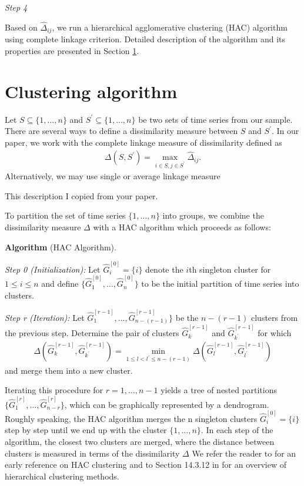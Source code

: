 \documentclass[a4paper,11pt]{article}
\numberwithin{equation}{section}
\begin{document}
\textit{Step 4}

Based on $\widehat{\Delta}_{ij}$, we run a hierarchical agglomerative clustering (HAC) algorithm using complete linkage criterion. Detailed description of the algorithm and its properties are presented in Section \ref{sec:alg}.

\section{Clustering algorithm}\label{sec:alg}

Let $S \subseteq \{1, \ldots, n\}$ and $S^\prime \subseteq \{1, \ldots, n\}$ be two sets of time series from our sample. There are several ways to define a dissimilarity measure between $S$ and $S^\prime$. In our paper, we work with the complete linkage measure of dissimilarity defined as 
\begin{align*}
\Delta (S, S^\prime) = \max_{i \in S, j\in S^\prime} \widehat{\Delta}_{ij}.
\end{align*}
Alternatively, we may use single or average linkage measure 

{\color{red} This description I copied from your paper.

To partition the set of time series $\{1,\ldots, n\}$ into groups, we combine the dissimilarity measure $\Delta$ with a HAC algorithm which proceeds as follows:

\textbf{Algorithm} (HAC Algorithm).

\textit{Step 0 (Initialization):} Let $\hat{G}_i^{[0]} = \{i\}$ denote the $i$th singleton cluster for $1 \leq i \leq n$ and define $\{\hat{G}_1^{[0]}, \ldots, \hat{G}_n^{[0]}\}$ to be the
initial partition of time series into clusters.

\textit{Step r (Iteration):} Let $\hat{G}^{[r-1]}_1, \ldots, \hat{G}^{[r-1]}_{n - (r-1)}\}$ be the $n-(r-1)$ clusters from the previous step. Determine the pair of clusters $\hat{G}^{[r-1]}_k$ and $\hat{G}^{[r-1]}_{k^\prime}$ for which 
\begin{align*}
\Delta(\hat{G}^{[r-1]}_{k}, \hat{G}^{[r-1]}_{k^\prime}) = \min_{1 \leq l < l^\prime \leq n- (r-1)} \Delta(\hat{G}^{[r-1]}_{l}, \hat{G}^{[r-1]}_{l^\prime})
\end{align*}
and merge them into a new cluster.

Iterating this procedure for $r = 1, \ldots, n-1$ yields a tree of nested partitions \linebreak $\{\hat{G}^{[r]}_1, \ldots, \hat{G}^{[r]}_{n-r} \}$, which can be graphically
represented by a dendrogram. Roughly speaking, the HAC algorithm merges the n singleton clusters $\hat{G}^{[0]}_i = \{i\}$ step by step until we end up with the cluster $\{1, \ldots, n\}$. In each step of the algorithm, the closest two clusters are merged, where the distance between clusters is measured in terms of the dissimilarity $\Delta$ We refer the reader to \cite{Ward1963} for an early reference on HAC clustering and to Section 14.3.12 in \cite{HastieTibshiraniFriedman2009} for an overview of hierarchical clustering methods.}
\end{document}
